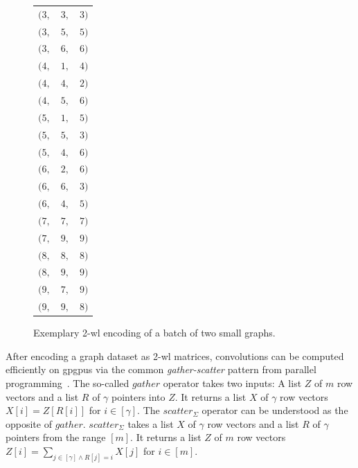 \begin{figure}[t]
{\begin{tabu}{c c c}
		\rowfont{\color{t_blue}}$(3,$ & $3,$ & $3)$ \\ %
		\rowfont{\color{t_blue}}$(3,$ & $5,$ & $5)$ \\ %
		\rowfont{\color{t_blue}}$(3,$ & $6,$ & $6)$ \\ %
		\rowfont{\color{t_red}}$(4,$ & $1,$ & $4)$ \\ %
		\rowfont{\color{t_red}}$(4,$ & $4,$ & $2)$ \\ %
		\rowfont{\color{t_red}}$(4,$ & $5,$ & $6)$ \\ %
		\rowfont{\color{t_red}}$(5,$ & $1,$ & $5)$ \\ %
		\rowfont{\color{t_red}}$(5,$ & $5,$ & $3)$ \\ %
		\rowfont{\color{t_red}}$(5,$ & $4,$ & $6)$ \\ %
		\rowfont{\color{t_red}}$(6,$ & $2,$ & $6)$ \\ %
		\rowfont{\color{t_red}}$(6,$ & $6,$ & $3)$ \\ %
		\rowfont{\color{t_red}}$(6,$ & $4,$ & $5)$ \\ %
		\midrule
		\rowfont{\color{t_blue}}$(7,$ & $7,$ & $7)$ \\ %
		\rowfont{\color{t_blue}}$(7,$ & $9,$ & $9)$ \\ %
		\rowfont{\color{t_blue}}$(8,$ & $8,$ & $8)$ \\ %
		\rowfont{\color{t_blue}}$(8,$ & $9,$ & $9)$ \\ %
		\rowfont{\color{t_red}}$(9,$ & $7,$ & $9)$ \\ %
		\rowfont{\color{t_red}}$(9,$ & $9,$ & $8)$ %
	\end{tabu}%
	}\caption{
		Exemplary 2-\acs{wl} encoding of a batch of two small graphs.
	}\label{fig:ltd:wl2-encoding}
\end{figure}
After encoding a graph dataset as 2-\acs{wl} matrices, convolutions can be computed efficiently on \acp{gpgpu} via the common \textit{gather-scatter} pattern from parallel programming~\cite{He2007}.
The so-called $\mathit{gather}$ operator takes two inputs: A list $Z$ of $m$ row vectors and a list $R$ of $\gamma$ pointers into $Z$.
It returns a list $X$ of $\gamma$ row vectors $X[i] = Z[R[i]]$ for $i \in [\gamma]$.
The $\mathit{scatter}_{\Sigma}$ operator can be understood as the opposite of $\mathit{gather}$.
$\mathit{scatter}_{\Sigma}$ takes a list $X$ of $\gamma$ row vectors and a list $R$ of $\gamma$ pointers from the range $[m]$.
It returns a list $Z$ of $m$ row vectors $Z[i] = \sum_{j \in [\gamma] \land R[j] = i} X[j]$ for $i \in [m]$.

